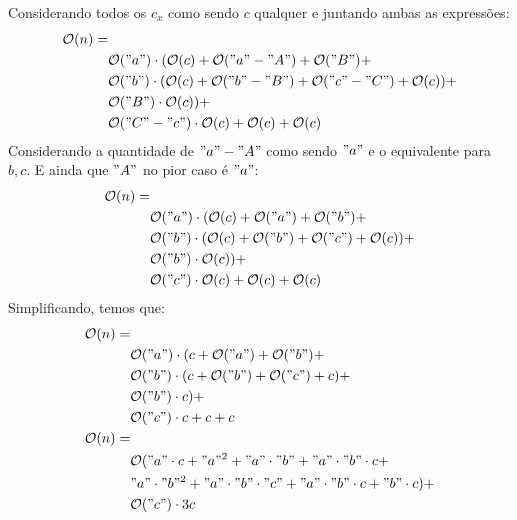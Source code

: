 \documentclass{article}
\begin{document}
Considerando todos os $c_x$ como sendo $c$ qualquer e juntando ambas as expressões:
\begin{align}
  \begin{split}
    \mathcal{O}(n) = &{}\\
                     &\mathcal{O}("a") \cdot (\mathcal{O}(c) + \mathcal{O}("a"-"A") + \mathcal{O}("B") + \\
                     &\mathcal{O}("b") \cdot (\mathcal{O}(c) + \mathcal{O}("b"-"B") + \mathcal{O}("c"-"C") + \mathcal{O}(c)) + \\
                     &\mathcal{O}("B") \cdot \mathcal{O}(c)) + \\
                     &\mathcal{O}("C"-"c") \cdot \mathcal{O}(c) + \mathcal{O}(c) + \mathcal{O}(c) \\
  \end{split}
\end{align}
Considerando a quantidade de $"a" - "A"$ como sendo $"a"$ e o equivalente para $b, c$. E ainda que $"A"$ no pior caso é $"a"$:
\begin{align}
  \begin{split}
    \mathcal{O}(n) = &{}\\
                     &\mathcal{O}("a") \cdot (\mathcal{O}(c) + \mathcal{O}("a") + \mathcal{O}("b") + \\
                     &\mathcal{O}("b") \cdot (\mathcal{O}(c) + \mathcal{O}("b") + \mathcal{O}("c") + \mathcal{O}(c)) + \\
                     &\mathcal{O}("b") \cdot \mathcal{O}(c)) + \\
                     &\mathcal{O}("c") \cdot \mathcal{O}(c) + \mathcal{O}(c) + \mathcal{O}(c) \\
  \end{split}
\end{align}
Simplificando, temos que:
\begin{align}
  \begin{split}
    \mathcal{O}(n) = &{}\\
                     &\mathcal{O}("a") \cdot (c + \mathcal{O}("a") + \mathcal{O}("b") + \\
                     &\mathcal{O}("b") \cdot (c + \mathcal{O}("b") + \mathcal{O}("c") + c) + \\
                     &\mathcal{O}("b") \cdot c) + \\
                     &\mathcal{O}("c") \cdot c + c + c \\
    \mathcal{O}(n) = &{}\\
                     &\mathcal{O}("a" \cdot c + "a"^2 + "a" \cdot "b" + "a"\cdot "b" \cdot c + \\
                     &"a"\cdot"b"^2 + "a" \cdot "b" \cdot "c" + "a" \cdot "b" \cdot c + "b" \cdot c) + \\
                     &\mathcal{O}("c") \cdot 3c
  \end{split}
\end{align}
\end{document}
